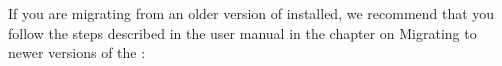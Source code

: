 If you are migrating from an older version of \app{} installed, we recommend that you follow the steps described in the user manual in the chapter on Migrating to newer versions of the \gddb{}:











 




